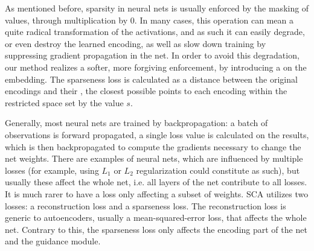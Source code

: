 			As mentioned before, sparsity in neural nets is usually enforced by the masking of values, through multiplication by $0$.
			In many cases, this operation can mean a quite radical transformation of the activations, and as such it can easily degrade, or even destroy the learned encoding, as well as slow down training by suppressing gradient propagation in the net.
			In order to avoid this degradation, our method realizes a softer, more forgiving enforcement, by introducing a  on the embedding.
			The sparseness loss is calculated as a distance between the original encodings and their , the closest possible points to each encoding within the restricted space set by the value $s$.
			
			Generally, most neural nets are trained by backpropagation: a batch of observations is forward propagated, a single loss value is calculated on the results, which is then backpropagated to compute the gradients necessary to change the net weights.
			There are examples of neural nets, which are influenced by multiple losses (for example, using $L_1$ or $L_2$ regularization could constitute as such), but usually these affect the whole net, i.e. all layers of the net contribute to all losses.
			It is much rarer to have a loss only affecting a subset of weights.
			\ac{SCA} utilizes two losses: a reconstruction loss and a sparseness loss.
			The reconstruction loss is generic to autoencoders, usually a mean-squared-error loss, that affects the whole net.
			Contrary to this, the sparseness loss only affects the encoding part of the net and the guidance module.
			
